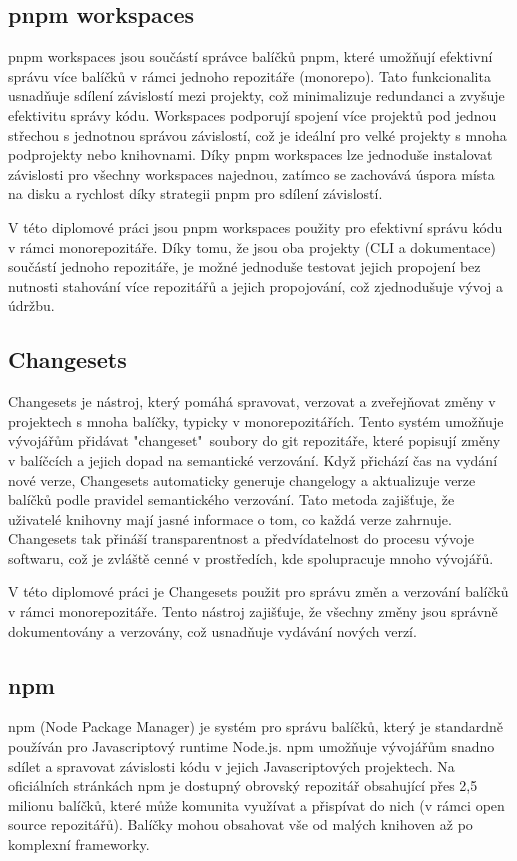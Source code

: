 \subsection{pnpm workspaces}
pnpm workspaces jsou součástí správce balíčků pnpm, které umožňují efektivní správu více balíčků v rámci jednoho repozitáře (monorepo). Tato funkcionalita usnadňuje sdílení závislostí mezi projekty, což minimalizuje redundanci a zvyšuje efektivitu správy kódu. Workspaces podporují spojení více projektů pod jednou střechou s jednotnou správou závislostí, což je ideální pro velké projekty s mnoha podprojekty nebo knihovnami. Díky pnpm workspaces lze jednoduše instalovat závislosti pro všechny workspaces najednou, zatímco se zachovává úspora místa na disku a rychlost díky strategii pnpm pro sdílení závislostí. \cite{PnpmWorkspaces}

V této diplomové práci jsou pnpm workspaces použity pro efektivní správu kódu v rámci monorepozitáře. Díky tomu, že jsou oba projekty (CLI a dokumentace) součástí jednoho repozitáře, je možné jednoduše testovat jejich propojení bez nutnosti stahování více repozitářů a jejich propojování, což zjednodušuje vývoj a údržbu.


\subsection{Changesets}
Changesets je nástroj, který pomáhá spravovat, verzovat a zveřejňovat změny v projektech s mnoha balíčky, typicky v monorepozitářích. Tento systém umožňuje vývojářům přidávat "changeset"~soubory do git repozitáře, které popisují změny v balíčcích a jejich dopad na semantické verzování. Když přichází čas na vydání nové verze, Changesets automaticky generuje changelogy a aktualizuje verze balíčků podle pravidel semantického verzování. Tato metoda zajišťuje, že uživatelé knihovny mají jasné informace o tom, co každá verze zahrnuje. Changesets tak přináší transparentnost a předvídatelnost do procesu vývoje softwaru, což je zvláště cenné v prostředích, kde spolupracuje mnoho vývojářů. \cite{Changesets}

V této diplomové práci je Changesets použit pro správu změn a verzování balíčků v rámci monorepozitáře. Tento nástroj zajišťuje, že všechny změny jsou správně dokumentovány a verzovány, což usnadňuje vydávání nových verzí.

\subsection{npm}
npm (Node Package Manager) je systém pro správu balíčků, který je standardně používán pro Javascriptový runtime Node.js. npm umožňuje vývojářům snadno sdílet a spravovat závislosti kódu v jejich Javascriptových projektech. Na oficiálních stránkách npm je dostupný obrovský repozitář obsahující přes 2,5 milionu balíčků, které může komunita využívat a přispívat do nich (v rámci open source repozitářů). Balíčky mohou obsahovat vše od malých knihoven až po komplexní frameworky. \cite{Npm}

